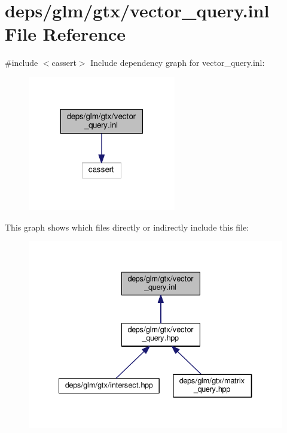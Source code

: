 \hypertarget{vector__query_8inl}{}\section{deps/glm/gtx/vector\+\_\+query.inl File Reference}
\label{vector__query_8inl}
{\ttfamily \#include $<$cassert$>$}\newline
Include dependency graph for vector\+\_\+query.\+inl\+:
\nopagebreak
\begin{figure}[H]
\begin{center}
\leavevmode
\includegraphics[width=183pt]{d4/d8a/vector__query_8inl__incl}
\end{center}
\end{figure}
This graph shows which files directly or indirectly include this file\+:
\nopagebreak
\begin{figure}[H]
\begin{center}
\leavevmode
\includegraphics[width=334pt]{de/dbf/vector__query_8inl__dep__incl}
\end{center}
\end{figure}
